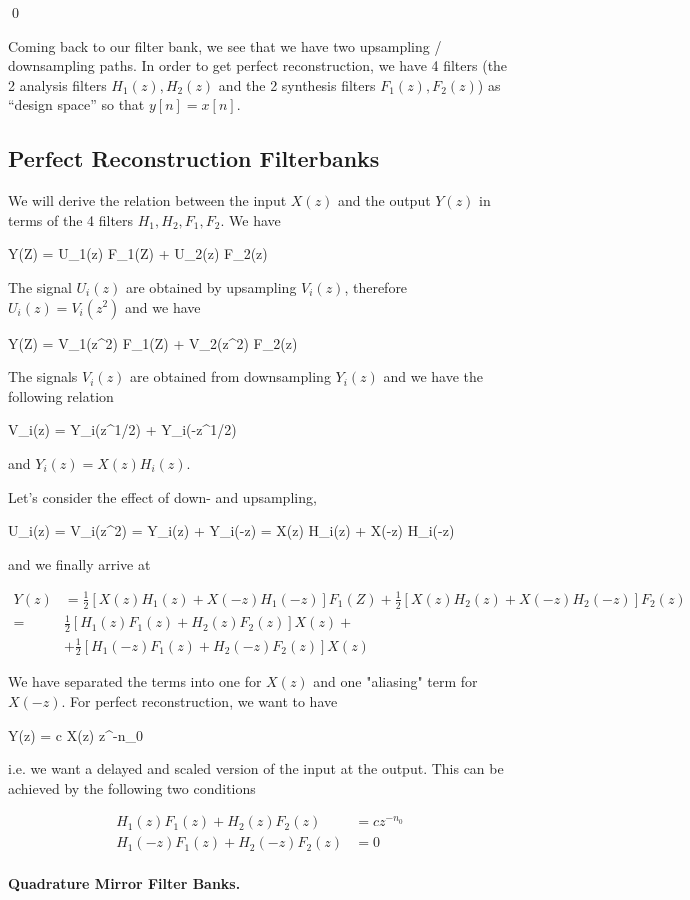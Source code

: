 \qed


Coming back to our filter bank, we see that we have two upsampling / downsampling paths. In order to get perfect reconstruction, we have 4 filters (the 2 analysis filters $H_1(z), H_2(z)$ and the 2 synthesis filters $F_1(z), F_2(z)$) as ``design space'' so that $y[n] = x[n]$.


\subsection*{Perfect Reconstruction Filterbanks}

We will derive the relation between the input $X(z)$ and the output $Y(z)$ in terms of the 4 filters $H_1, H_2, F_1, F_2$. We have

\bee
Y(Z) = U_1(z) F_1(Z) + U_2(z) F_2(z)
\eee

The signal $U_i(z)$ are obtained by upsampling $V_i(z)$, therefore $U_i(z) = V_i(z^2)$ and we have

\bee
Y(Z) = V_1(z^2) F_1(Z) + V_2(z^2) F_2(z)
\eee

The signals $V_i(z)$ are obtained from downsampling $Y_i(z)$ and we have the following relation

\bee
V_i(z) =  Y_i(z^{1/2}) +  Y_i(-z^{1/2})
\eee

and $Y_i(z) = X(z) H_i(z)$.

Let's consider the effect of down- and upsampling,

\bee
U_i(z) = V_i(z^2) =  Y_i(z) +  Y_i(-z) =  X(z) H_i(z) +  X(-z) H_i(-z)
\eee

and we finally arrive at

\begin{align*}
Y(z) &= \frac{1}{2} \left[  X(z) H_1(z) + X(-z) H_1(-z) \right]  F_1(Z) + \frac{1}{2} \left[ X(z) H_2(z) +  X(-z) H_2(-z) \right] F_2(z) \\
= &\frac{1}{2} \left[ H_1(z) F_1(z) + H_2(z) F_2(z) \right] X(z) + \\
&+ \frac{1}{2} \left[ H_1(-z) F_1(z) + H_2(-z) F_2(z) \right] X(z)
\end{align*}

We have separated the terms into one for $X(z)$ and one "aliasing" term for $X(-z)$. For perfect reconstruction, we want to have

\bee
Y(z) = c X(z) z^{-n_0}
\eee

i.e. we want a delayed and scaled version of the input at the output. This can be achieved by the following two conditions

\begin{align*}
H_1(z) F_1(z) + H_2(z) F_2(z) &= c z^{-n_0} \\
H_1(-z) F_1(z) + H_2(-z) F_2(z) &= 0
\end{align*}


\paragraph{Quadrature Mirror Filter Banks.}




